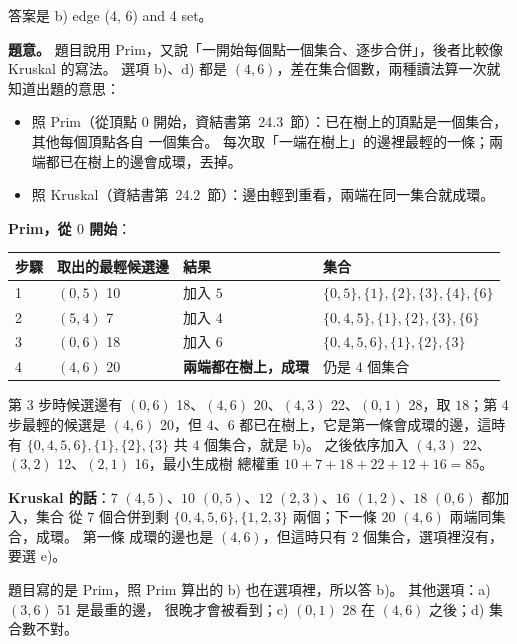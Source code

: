 \begin{pastsoln}
答案是 b) edge (4, 6) and 4 set。

\textbf{題意。} 題目說用 Prim，又說「一開始每個點一個集合、逐步合併」，後者比較像 Kruskal 的寫法。
選項 b)、d) 都是 $(4, 6)$，差在集合個數，兩種讀法算一次就知道出題的意思：
\begin{itemize}
\item 照 Prim（從頂點 $0$ 開始，資結書第~24.3~節）：已在樹上的頂點是一個集合，其他每個頂點各自
一個集合。 每次取「一端在樹上」的邊裡最輕的一條；兩端都已在樹上的邊會成環，丟掉。
\item 照 Kruskal（資結書第~24.2~節）：邊由輕到重看，兩端在同一集合就成環。
\end{itemize}

\textbf{Prim，從 $0$ 開始}：
\begin{center}
\begin{tabular}{llll}
\toprule
步驟 & 取出的最輕候選邊 & 結果 & 集合 \\
\midrule
1 & $(0, 5)$ 10 & 加入 $5$ & $\{0, 5\}, \{1\}, \{2\}, \{3\}, \{4\}, \{6\}$ \\
2 & $(5, 4)$ 7 & 加入 $4$ & $\{0, 4, 5\}, \{1\}, \{2\}, \{3\}, \{6\}$ \\
3 & $(0, 6)$ 18 & 加入 $6$ & $\{0, 4, 5, 6\}, \{1\}, \{2\}, \{3\}$ \\
4 & $(4, 6)$ 20 & \textbf{兩端都在樹上，成環} & 仍是 $4$ 個集合 \\
\bottomrule
\end{tabular}
\end{center}
第 3 步時候選邊有 $(0, 6)$ 18、$(4, 6)$ 20、$(4, 3)$ 22、$(0, 1)$ 28，取 $18$；第 4 步最輕的候選是
$(4, 6)$ 20，但 $4$、$6$ 都已在樹上，它是第一條會成環的邊，這時有 $\{0, 4, 5, 6\}, \{1\}, \{2\},
\{3\}$ 共 $4$ 個集合，就是 b)。 之後依序加入 $(4, 3)$ 22、$(3, 2)$ 12、$(2, 1)$ 16，最小生成樹
總權重 $10 + 7 + 18 + 22 + 12 + 16 = 85$。

\textbf{Kruskal 的話}：$7$ $(4,5)$、$10$ $(0,5)$、$12$ $(2,3)$、$16$ $(1,2)$、$18$ $(0,6)$ 都加入，集合
從 $7$ 個合併到剩 $\{0, 4, 5, 6\}, \{1, 2, 3\}$ 兩個；下一條 $20$ $(4, 6)$ 兩端同集合，成環。 第一條
成環的邊也是 $(4, 6)$，但這時只有 $2$ 個集合，選項裡沒有，要選 e)。

題目寫的是 Prim，照 Prim 算出的 b) 也在選項裡，所以答 b)。 其他選項：a) $(3, 6)$ 51 是最重的邊，
很晚才會被看到；c) $(0, 1)$ 28 在 $(4, 6)$ 之後；d) 集合數不對。
\end{pastsoln}
